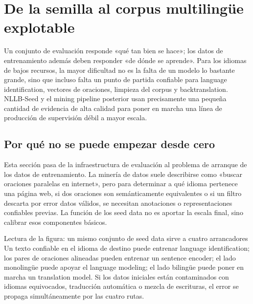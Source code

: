 \section{De la semilla al corpus multilingüe explotable}

Un conjunto de evaluación responde «qué tan bien se hace»; los datos de entrenamiento además deben responder «de dónde se aprende». Para los idiomas de bajos recursos, la mayor dificultad no es la falta de un modelo lo bastante grande, sino que incluso falta un punto de partida confiable para language identification, vectores de oraciones, limpieza del corpus y backtranslation. NLLB-Seed y el mining pipeline posterior usan precisamente una pequeña cantidad de evidencia de alta calidad para poner en marcha una línea de producción de supervisión débil a mayor escala.

\subsection{Por qué no se puede empezar desde cero}

Esta sección pasa de la infraestructura de evaluación al problema de arranque de los datos de entrenamiento. La minería de datos suele describirse como «buscar oraciones paralelas en internet», pero para determinar a qué idioma pertenece una página web, si dos oraciones son semánticamente equivalentes o si un filtro descarta por error datos válidos, se necesitan anotaciones o representaciones confiables previas. La función de los seed data no es aportar la escala final, sino calibrar esos componentes básicos.


\begin{knowledgebox}{Lectura de la figura: un mismo conjunto de seed data sirve a cuatro arrancadores}
Un texto confiable en el idioma de destino puede entrenar language identification; los pares de oraciones alineadas pueden entrenar un sentence encoder; el lado monolingüe puede apoyar el language modeling; el lado bilingüe puede poner en marcha un translation model. Si los datos iniciales están contaminados con idiomas equivocados, traducción automática o mezcla de escrituras, el error se propaga simultáneamente por las cuatro rutas.
\end{knowledgebox}

